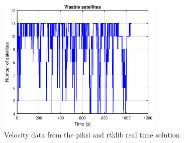 \begin{figure}[H]
	\centering
		\includegraphics[width=0.7\textwidth]{figs/plots/numSatFlight.eps}
		\caption{Velocity data from the piksi and rtklib real time solution}
		\label{figure:numSatFlight}
\end{figure}

